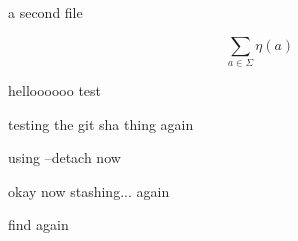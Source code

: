 \documentclass{article}
\begin{document}
a second file

\[
    \sum_{a\in\Sigma} \eta(a)
\]

helloooooo test

testing the git sha thing again

using --detach now

okay now stashing... again

find again
\end{document}
